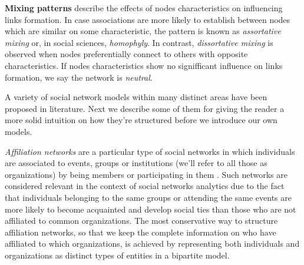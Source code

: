 

\textbf{Mixing patterns} describe the effects of nodes characteristics on influencing links formation.
In case associations are more likely to establish between nodes which are similar on some characteristic, the pattern is known as \textit{assortative mixing} or, in social sciences, \textit{homophyly}.
In contrast, \textit{dissortative mixing} is observed when nodes preferentially connect to others with opposite characteristics. 
If nodes characteristics show no signifficant influence on links formation, we say the network is \textit{neutral}.


A variety of social network models within many distinct areas have been proposed in literature. 
Next we describe some of them for giving the reader a more solid intuition on how they're structured before we introduce our own models.


\textit{Affiliation networks} are a particular type of social networks in which individuals are associated to events, groups or institutions (we'll refer to all those as organizations) by being members or participating in them \cite{Borgatti2015}. 
%
Such networks are considered relevant in the context of social networks analytics due to the fact that individuals belonging to the same groups or attending the same events are more likely to become acquainted and develop social ties than those who are not affiliated to common organizations.
%
The most conservative way to structure affiliation networks, so that we keep the complete information on who have affiliated to which organizations, is achieved by representing both individuals and organizations as distinct types of entities in a bipartite model.
 
